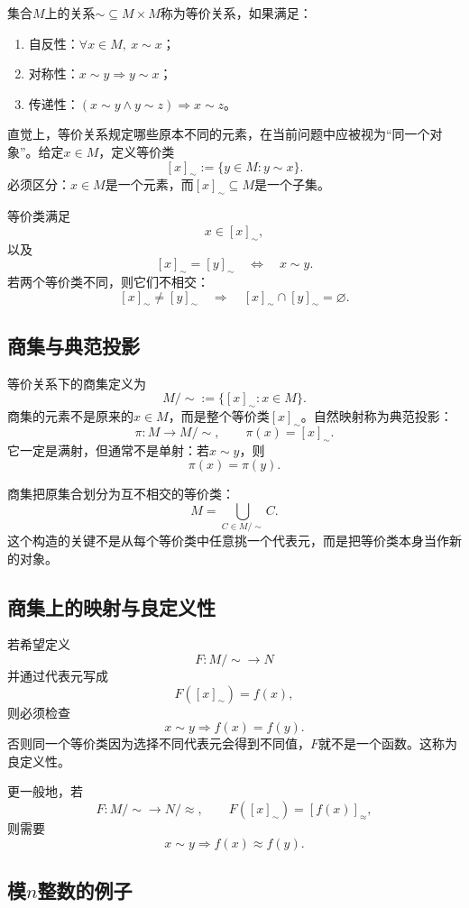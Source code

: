 集合$M$上的关系$\sim\subseteq M\times M$称为等价关系，如果满足：
\begin{enumerate}
    \item 自反性：$\forall x\in M,\ x\sim x$；
    \item 对称性：$x\sim y\Rightarrow y\sim x$；
    \item 传递性：$(x\sim y\land y\sim z)\Rightarrow x\sim z$。
\end{enumerate}

直觉上，等价关系规定哪些原本不同的元素，在当前问题中应被视为“同一个对象”。给定$x\in M$，定义等价类
\[
    [x]_{\sim}:=\{y\in M:y\sim x\}.
\]
必须区分：$x\in M$是一个元素，而$[x]_{\sim}\subseteq M$是一个子集。

等价类满足
\[
    x\in[x]_{\sim},
\]
以及
\[
    [x]_{\sim}=[y]_{\sim}
    \quad\Longleftrightarrow\quad
    x\sim y.
\]
若两个等价类不同，则它们不相交：
\[
    [x]_{\sim}\neq[y]_{\sim}
    \quad\Longrightarrow\quad
    [x]_{\sim}\cap[y]_{\sim}=\varnothing.
\]

\subsection{商集与典范投影}

等价关系下的商集定义为
\[
    M/{\sim}:=\{[x]_{\sim}:x\in M\}.
\]
商集的元素不是原来的$x\in M$，而是整个等价类$[x]_{\sim}$。自然映射称为典范投影：
\[
    \pi:M\to M/{\sim},
    \qquad
    \pi(x)=[x]_{\sim}.
\]
它一定是满射，但通常不是单射：若$x\sim y$，则
\[
    \pi(x)=\pi(y).
\]

商集把原集合划分为互不相交的等价类：
\[
    M=\bigcup_{C\in M/{\sim}}C.
\]
这个构造的关键不是从每个等价类中任意挑一个代表元，而是把等价类本身当作新的对象。

\subsection{商集上的映射与良定义性}

若希望定义
\[
    F:M/{\sim}\to N
\]
并通过代表元写成
\[
    F([x]_{\sim})=f(x),
\]
则必须检查
\[
    x\sim y\Longrightarrow f(x)=f(y).
\]
否则同一个等价类因为选择不同代表元会得到不同值，$F$就不是一个函数。这称为良定义性。

更一般地，若
\[
    F:M/{\sim}\to N/{\approx},
    \qquad
    F([x]_{\sim})=[f(x)]_{\approx},
\]
则需要
\[
    x\sim y\Longrightarrow f(x)\approx f(y).
\]

\subsection{模$n$整数的例子}

